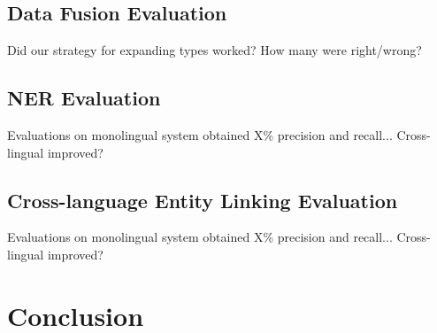 \documentclass[10pt,a4paper]{article}
\begin{document}
\subsection{Data Fusion Evaluation}

Did our strategy for expanding types worked? How many were right/wrong?

\subsection{NER Evaluation}

Evaluations on monolingual system obtained X\% precision and recall...
Cross-lingual improved?

\subsection{Cross-language Entity Linking Evaluation}

Evaluations on monolingual system obtained X\% precision and recall...
Cross-lingual improved?

\section{Conclusion}




\end{document}
